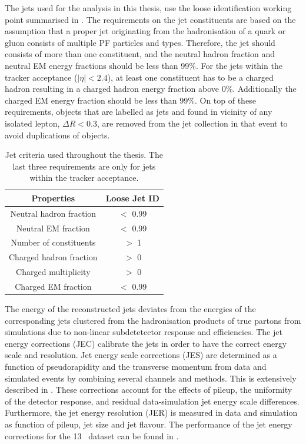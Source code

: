 The jets used for the analysis  in this thesis, use the loose identification working point summarised in . The requirements on the jet constituents are based on the assumption that a proper jet originating from the hadronisation of a quark or gluon consists of multiple PF particles and types. Therefore, the jet should consists of more than one constituent, and the neutral hadron fraction and neutral EM energy fractions should be less than 99\%. For the jets within the tracker acceptance ($|\eta|<2.4$), at least one constituent has to be a charged hadron resulting in a charged hadron energy fraction above 0\%. Additionally the charged EM energy fraction should be less than 99\%. On top of these requirements, objects that are labelled as jets and found in vicinity of any isolated lepton, $\Delta R < 0.3$, are removed from the jet collection in that event to avoid duplications of objects. 
\begin{table}[h]
	\centering
	\caption{Jet criteria used throughout the thesis. The last three requirements are only for jets within the tracker acceptance.}
	\begin{tabular}{cc}
		\toprule 
		Properties & Loose Jet ID \\ 
		\midrule
		Neutral hadron fraction & $<$ 0.99 \\ 
		
		Neutral EM fraction & $<$ 0.99 \\ 
		
		Number of constituents & $>$ 1 \\ 
		 		
		Charged hadron fraction & $>$ 0 \\ 
	 
		Charged multiplicity & $>$ 0 \\ 
		
		Charged EM fraction & $<$ 0.99 \\ 
		\bottomrule
	\end{tabular} 
	\label{tab:jetID}
\end{table}

The energy of the reconstructed jets deviates from the energies of the corresponding jets clustered from the hadronisation products of true partons from simulations due to non-linear subdetetector response and efficiencies. The jet energy corrections (JEC) calibrate the jets in order to have the correct energy scale and resolution.
Jet energy scale corrections (JES) are determined as a function of pseudorapidity and the transverse momentum from data and simulated events by combining several channels and methods. This is extensively described in \cite{1748-0221-12-02-P02014}. These corrections account for the effects of pileup, the uniformity of the detector response, and residual data-simulation jet energy scale differences. Furthermore, the jet energy resolution (JER) is measured in data and simulation as function of pileup, jet size and jet flavour.  %
 The performance of the jet energy corrections for the 13 \TeV\ dataset can be found in \cite{CMS-DP-2016-020}.


